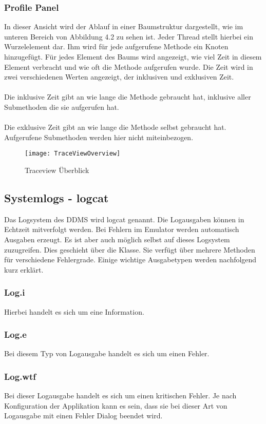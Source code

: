 \subsubsection{Profile Panel}
In dieser Ansicht wird der Ablauf in einer Baumstruktur dargestellt, wie im unteren Bereich von Abbildung 4.2 zu sehen ist. Jeder Thread stellt hierbei ein Wurzelelement dar. Ihm wird für jede aufgerufene Methode ein Knoten hinzugefügt. Für jedes Element des Baums wird angezeigt, wie viel Zeit in diesem Element verbracht und wie oft die Methode aufgerufen wurde. Die Zeit wird in zwei verschiedenen Werten angezeigt, der inklusiven und exklusiven Zeit.\cite{42}
\\
\\
Die inklusive Zeit gibt an wie lange die Methode gebraucht hat, inklusive aller Submethoden die sie aufgerufen hat.
\\
\\
Die exklusive Zeit gibt an wie lange die Methode selbst gebraucht hat. Aufgerufene Submethoden werden hier nicht miteinbezogen.

\begin{figure}
\centering
\texttt{[image: TraceViewOverview]}
\caption{Traceview Überblick}
\label{fig:TraceViewOverview}
\end{figure}

\subsection{Systemlogs - logcat}
Das Logsystem des DDMS wird logcat genannt. Die Logausgaben können in Echtzeit mitverfolgt werden. Bei Fehlern im Emulator werden automatisch Ausgaben erzeugt. Es ist aber auch möglich selbst auf dieses Logsystem zuzugreifen. Dies geschieht über die  Klasse. Sie verfügt über mehrere Methoden für verschiedene Fehlergrade. Einige wichtige Ausgabetypen werden nachfolgend kurz erklärt.\cite{43}

\subsubsection{Log.i}
Hierbei handelt es sich um eine Information.\cite{43}

\subsubsection{Log.e}
Bei diesem Typ von Logausgabe handelt es sich um einen Fehler.\cite{43}

\subsubsection{Log.wtf}
Bei dieser Logausgabe handelt es sich um einen kritischen Fehler. Je nach Konfiguration der Applikation kann es sein, dass sie bei dieser Art von Logausgabe mit einen Fehler Dialog beendet wird.\cite{43}



